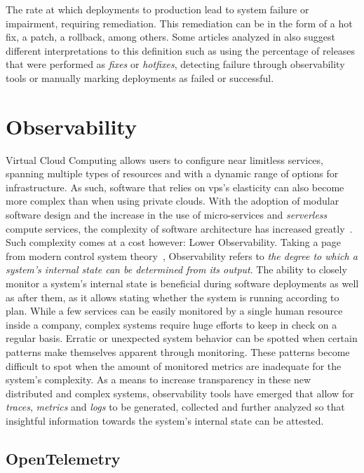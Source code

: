 The rate at which deployments to production lead to system failure or impairment, requiring remediation. This remediation can be in the form of a hot fix, a patch, a rollback, among others. Some articles analyzed in \parencite{sallin_kropp_anslow_quilty_meier_2021} also suggest different interpretations to this definition such as using the percentage of releases that were performed as \textit{fixes} or \textit{hotfixes}, detecting failure through observability tools or manually marking deployments as failed or successful.


\section{Observability}\label{state-of-the-art:s:observability}

Virtual Cloud Computing allows users to configure near limitless services, spanning multiple types of resources and with a dynamic range of options for infrastructure. As such, software that relies on \gls{vps}'s elasticity can also become more complex than when using private clouds. With the adoption of modular software design and the increase in the use of micro-services and \textit{serverless} compute services, the complexity of software architecture has increased greatly~\Parencite{niedermaier_koetter_freymann_wagner_2019}.
Such complexity comes at a cost however: Lower Observability. Taking a page from modern control system theory~\Parencite{gopal1993modern}, Observability refers to \textit{the degree to which a system's internal state can be determined from its output}. 
The ability to closely monitor a system's internal state is beneficial during software deployments as well as after them, as it allows stating whether the system is running according to plan.
While a few services can be easily monitored by a single human resource inside a company, complex systems require huge efforts to keep in check on a regular basis. 
Erratic or unexpected system behavior can be spotted when certain patterns make themselves apparent through monitoring. These patterns become difficult to spot when the amount of monitored metrics are inadequate for the system's complexity.
As a means to increase transparency in these new distributed and complex systems, observability tools have emerged that allow for \textit{traces}, \textit{metrics} and \textit{logs} to be generated, collected and further analyzed so that insightful information towards the system's internal state can be attested.

\subsection{OpenTelemetry}\label{state-of-the-art:ss:opentelemetry}

